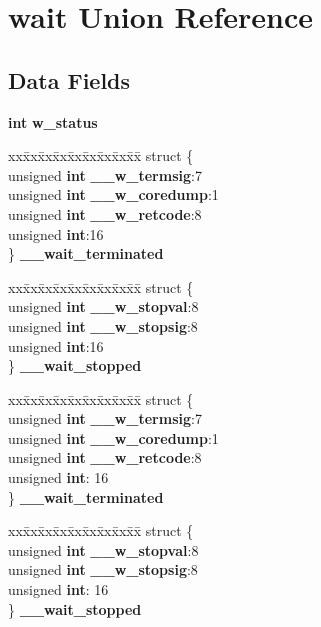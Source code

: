 \section{wait Union Reference}
\label{unionwait}
\subsection*{Data Fields}
\begin{DoxyCompactItemize}
\item 
{\bf int} {\bf w\_\-status}
\item 
\begin{tabbing}
xx\=xx\=xx\=xx\=xx\=xx\=xx\=xx\=xx\=\kill
struct \{\\
\>unsigned {\bf int} {\bf \_\_w\_termsig}:7\\
\>unsigned {\bf int} {\bf \_\_w\_coredump}:1\\
\>unsigned {\bf int} {\bf \_\_w\_retcode}:8\\
\>unsigned {\bf int}:16\\
\} {\bf \_\_wait\_terminated}\\

\end{tabbing}\item 
\begin{tabbing}
xx\=xx\=xx\=xx\=xx\=xx\=xx\=xx\=xx\=\kill
struct \{\\
\>unsigned {\bf int} {\bf \_\_w\_stopval}:8\\
\>unsigned {\bf int} {\bf \_\_w\_stopsig}:8\\
\>unsigned {\bf int}:16\\
\} {\bf \_\_wait\_stopped}\\

\end{tabbing}\item 
\begin{tabbing}
xx\=xx\=xx\=xx\=xx\=xx\=xx\=xx\=xx\=\kill
struct \{\\
\>unsigned {\bf int} {\bf \_\_w\_termsig}:7\\
\>unsigned {\bf int} {\bf \_\_w\_coredump}:1\\
\>unsigned {\bf int} {\bf \_\_w\_retcode}:8\\
\>unsigned {\bf int}: 16\\
\} {\bf \_\_wait\_terminated}\\

\end{tabbing}\item 
\begin{tabbing}
xx\=xx\=xx\=xx\=xx\=xx\=xx\=xx\=xx\=\kill
struct \{\\
\>unsigned {\bf int} {\bf \_\_w\_stopval}:8\\
\>unsigned {\bf int} {\bf \_\_w\_stopsig}:8\\
\>unsigned {\bf int}: 16\\
\} {\bf \_\_wait\_stopped}\\

\end{tabbing}\end{DoxyCompactItemize}


